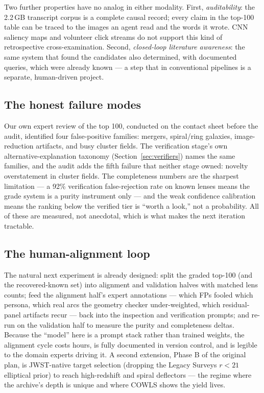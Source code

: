 \documentclass[11pt,letterpaper]{article}
\begin{document}
Two further properties have no analog in either modality. First,
\emph{auditability}: the 2.2\,GB transcript corpus is a complete causal
record; every claim in the top-100 table can be traced to the images an agent
read and the words it wrote. CNN saliency maps and volunteer click streams do
not support this kind of retrospective cross-examination. Second,
\emph{closed-loop literature awareness}: the same system that found the
candidates also determined, with documented queries, which were already
known --- a step that in conventional pipelines is a separate, human-driven
project.

\subsection{The honest failure modes}\label{sec:failures}

Our own expert review of the top 100, conducted on the contact sheet before
the audit, identified four false-positive families: mergers, spiral/ring
galaxies, image-reduction artifacts, and busy cluster fields. The
verification stage's own alternative-explanation taxonomy
(Section~\ref{sec:verifiers}) names the same families, and the audit adds the
fifth failure that neither stage owned: novelty overstatement in cluster
fields. The completeness numbers are the sharpest limitation --- a 92\%
verification false-rejection rate on known lenses means the grade system is a
purity instrument only --- and the weak confidence calibration means the
ranking below the verified tier is ``worth a look,'' not a probability. All
of these are measured, not anecdotal, which is what makes the next iteration
tractable.

\subsection{The human-alignment loop}\label{sec:alignment}

The natural next experiment is already designed: split the graded top-100
(and the recovered-known set) into alignment and validation halves with
matched lens counts; feed the alignment half's expert annotations --- which
FPs fooled which persona, which real arcs the geometry checker under-weighted,
which residual-panel artifacts recur --- back into the inspection and
verification prompts; and re-run on the validation half to measure the purity
and completeness deltas. Because the ``model'' here is a prompt stack rather
than trained weights, the alignment cycle costs hours, is fully documented in
version control, and is legible to the domain experts driving it. A second
extension, Phase B of the original plan, is JWST-native target selection
(dropping the Legacy Surveys $r<21$ elliptical prior) to reach high-redshift
and spiral deflectors --- the regime where the archive's depth is unique and
where COWLS \citep{nightingale2025cowls1} shows the yield lives.
\end{document}
